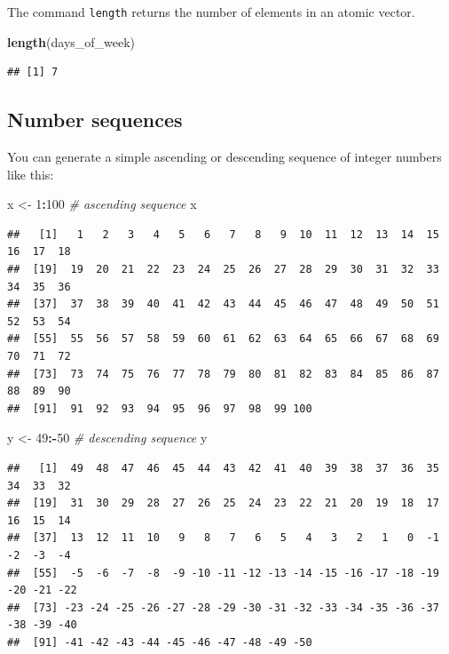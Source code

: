 \documentclass[
]{scrartcl}
\newenvironment{Shaded}{\begin{snugshade}}{\end{snugshade}}
\newcommand{\CommentTok}[1]{\textcolor[rgb]{0.56,0.35,0.01}{\textit{#1}}}
\newcommand{\DecValTok}[1]{\textcolor[rgb]{0.00,0.00,0.81}{#1}}
\newcommand{\FunctionTok}[1]{\textcolor[rgb]{0.13,0.29,0.53}{\textbf{#1}}}
\newcommand{\NormalTok}[1]{#1}
\newcommand{\OtherTok}[1]{\textcolor[rgb]{0.56,0.35,0.01}{#1}}
\newcommand{\SpecialCharTok}[1]{\textcolor[rgb]{0.81,0.36,0.00}{\textbf{#1}}}
\begin{document}
The command \texttt{length} returns the number of elements in an atomic vector.

\begin{Shaded}
\begin{Highlighting}[]
\FunctionTok{length}\NormalTok{(days\_of\_week)}
\end{Highlighting}
\end{Shaded}

\begin{verbatim}
## [1] 7
\end{verbatim}

\hypertarget{number-sequences}{%
\subsection{Number sequences}\label{number-sequences}}

You can generate a simple ascending or descending sequence of integer numbers like this:

\begin{Shaded}
\begin{Highlighting}[]
\NormalTok{x }\OtherTok{\textless{}{-}} \DecValTok{1}\SpecialCharTok{:}\DecValTok{100}   \CommentTok{\# ascending sequence}
\NormalTok{x}
\end{Highlighting}
\end{Shaded}

\begin{verbatim}
##   [1]   1   2   3   4   5   6   7   8   9  10  11  12  13  14  15  16  17  18
##  [19]  19  20  21  22  23  24  25  26  27  28  29  30  31  32  33  34  35  36
##  [37]  37  38  39  40  41  42  43  44  45  46  47  48  49  50  51  52  53  54
##  [55]  55  56  57  58  59  60  61  62  63  64  65  66  67  68  69  70  71  72
##  [73]  73  74  75  76  77  78  79  80  81  82  83  84  85  86  87  88  89  90
##  [91]  91  92  93  94  95  96  97  98  99 100
\end{verbatim}

\begin{Shaded}
\begin{Highlighting}[]
\NormalTok{y }\OtherTok{\textless{}{-}} \DecValTok{49}\SpecialCharTok{:{-}}\DecValTok{50}  \CommentTok{\# descending sequence}
\NormalTok{y}
\end{Highlighting}
\end{Shaded}

\begin{verbatim}
##   [1]  49  48  47  46  45  44  43  42  41  40  39  38  37  36  35  34  33  32
##  [19]  31  30  29  28  27  26  25  24  23  22  21  20  19  18  17  16  15  14
##  [37]  13  12  11  10   9   8   7   6   5   4   3   2   1   0  -1  -2  -3  -4
##  [55]  -5  -6  -7  -8  -9 -10 -11 -12 -13 -14 -15 -16 -17 -18 -19 -20 -21 -22
##  [73] -23 -24 -25 -26 -27 -28 -29 -30 -31 -32 -33 -34 -35 -36 -37 -38 -39 -40
##  [91] -41 -42 -43 -44 -45 -46 -47 -48 -49 -50
\end{verbatim}
\end{document}
